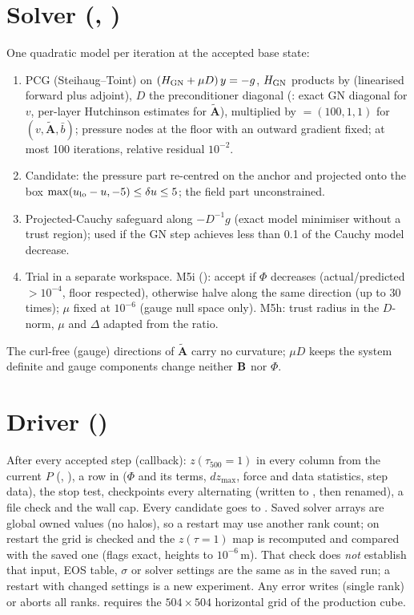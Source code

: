 \section{Solver (, )}
One quadratic model per iteration at the accepted base state:
\begin{enumerate}
\item PCG (Steihaug--Toint) on $(H_{\rm GN}+\mu D)\,y=-g$, $H_{\rm GN}$ products by  (linearised forward
plus adjoint), $D$ the preconditioner diagonal (: exact GN diagonal for $v$, per-layer Hutchinson
estimates for $\tilde{\mathbf A}$), multiplied by  $=(100,1,1)$ for $(v,\tilde{\mathbf A},\bar b)$;
pressure nodes at the floor with an outward gradient fixed; at most 100 iterations, relative residual $10^{-2}$.
\item Candidate: the pressure part re-centred on the anchor and projected onto the box $\max(u_{\rm lo}-u,-5)\le\delta u\le5$;
the field part unconstrained.
\item Projected-Cauchy safeguard along $-D^{-1}g$ (exact model minimiser without a trust region); used if the GN step
achieves less than 0.1 of the Cauchy model decrease.
\item Trial in a separate workspace. M5i (): accept if $\Phi$ decreases (actual/predicted
$>10^{-4}$, floor respected), otherwise halve along the same direction (up to 30 times); $\mu$ fixed at $10^{-6}$ (gauge
null space only). M5h: trust radius in the $D$-norm, $\mu$ and $\Delta$ adapted from the ratio.
\end{enumerate}
The curl-free (gauge) directions of $\tilde{\mathbf A}$ carry no curvature; $\mu D$ keeps the system definite and gauge
components change neither $\mathbf B$ nor $\Phi$.

\section{Driver ()}
After every accepted step (callback): $z(\tau_{500}{=}1)$ in every column from the current $P$
(, ), a row in  ($\Phi$ and its terms, $dz_{\max}$, force and data
statistics, step data), the stop test, checkpoints every  alternating 
(written to , then renamed), a  file check and the wall cap. Every candidate goes to
. Saved solver arrays are global owned values (no halos), so a restart may use another rank count;
on restart the grid is checked and the $z(\tau{=}1)$ map is recomputed and compared with the saved one (flags exact,
heights to $10^{-6}$\,m). That check does \emph{not} establish that input, EOS table, $\sigma$ or solver settings are the
same as in the saved run; a restart with changed settings is a new experiment. Any error writes
 (single rank) or aborts all ranks.  requires the $504\times504$
horizontal grid of the production cube.

